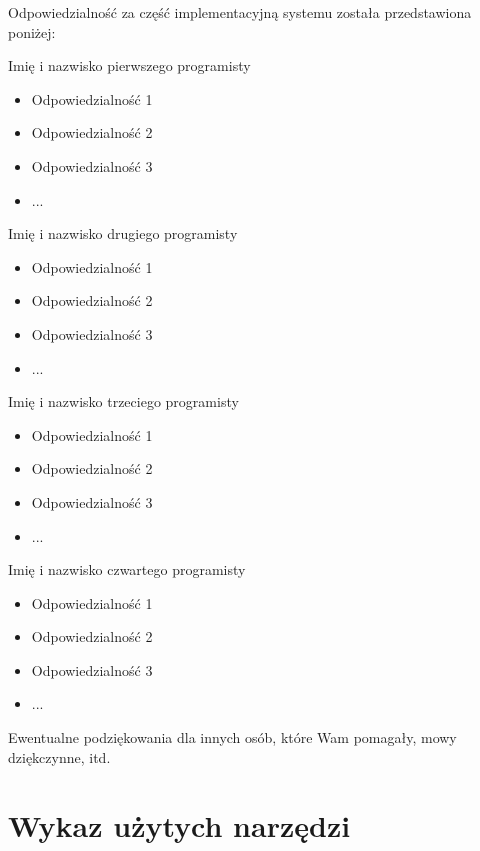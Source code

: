 \noindent

Odpowiedzialność za część implementacyjną systemu została przedstawiona poniżej:

\begin{description}
\item Imię i nazwisko pierwszego programisty

\begin{itemize}
\item Odpowiedzialność 1
\item Odpowiedzialność 2
\item Odpowiedzialność 3
\item ...
\end{itemize}
\noindent

\item Imię i nazwisko drugiego programisty

\begin{itemize}
\item Odpowiedzialność 1
\item Odpowiedzialność 2
\item Odpowiedzialność 3
\item ...
\end{itemize}
\noindent

\item Imię i nazwisko trzeciego programisty

\begin{itemize}
\item Odpowiedzialność 1
\item Odpowiedzialność 2
\item Odpowiedzialność 3
\item ...
\end{itemize}
\noindent

\item Imię i nazwisko czwartego programisty

\begin{itemize}
\item Odpowiedzialność 1
\item Odpowiedzialność 2
\item Odpowiedzialność 3
\item ...
\end{itemize}
\noindent

\end{description}

\noindent
Ewentualne podziękowania dla innych osób, które Wam pomagały, mowy dziękczynne, itd.

\section{Wykaz użytych narzędzi}
\label{Chapter104}

